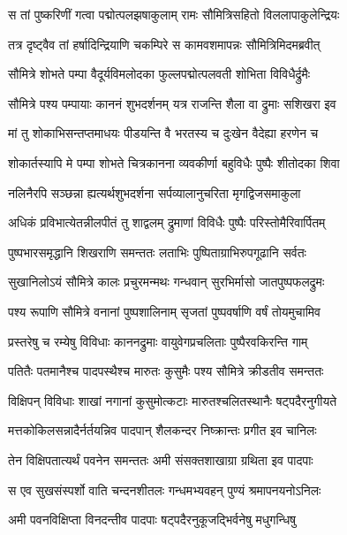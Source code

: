 
\twolineshloka
{स तां पुष्करिणीं गत्वा पद्मोत्पलझषाकुलाम्}
{रामः सौमित्रिसहितो विललापाकुलेन्द्रियः} %

\twolineshloka
{तत्र दृष्ट्वैव तां हर्षादिन्द्रियाणि चकम्पिरे}
{स कामवशमापन्नः सौमित्रिमिदमब्रवीत्} %

\twolineshloka
{सौमित्रे शोभते पम्पा वैदूर्यविमलोदका}
{फुल्लपद्मोत्पलवती शोभिता विविधैर्द्रुमैः} %

\twolineshloka
{सौमित्रे पश्य पम्पायाः काननं शुभदर्शनम्}
{यत्र राजन्ति शैला वा द्रुमाः सशिखरा इव} %

\twolineshloka
{मां तु शोकाभिसन्तप्तमाधयः पीडयन्ति वै}
{भरतस्य च दुःखेन वैदेह्या हरणेन च} %

\twolineshloka
{शोकार्तस्यापि मे पम्पा शोभते चित्रकानना}
{व्यवकीर्णा बहुविधैः पुष्पैः शीतोदका शिवा} %

\twolineshloka
{नलिनैरपि सञ्छन्ना ह्यत्यर्थशुभदर्शना}
{सर्पव्यालानुचरिता मृगद्विजसमाकुला} %

\twolineshloka
{अधिकं प्रविभात्येतन्नीलपीतं तु शाद्वलम्}
{द्रुमाणां विविधैः पुष्पैः परिस्तोमैरिवार्पितम्} %

\twolineshloka
{पुष्पभारसमृद्धानि शिखराणि समन्ततः}
{लताभिः पुष्पिताग्राभिरुपगूढानि सर्वतः} %

\twolineshloka
{सुखानिलोऽयं सौमित्रे कालः प्रचुरमन्मथः}
{गन्धवान् सुरभिर्मासो जातपुष्पफलद्रुमः} %

\twolineshloka
{पश्य रूपाणि सौमित्रे वनानां पुष्पशालिनाम्}
{सृजतां पुष्पवर्षाणि वर्षं तोयमुचामिव} %

\twolineshloka
{प्रस्तरेषु च रम्येषु विविधाः काननद्रुमाः}
{वायुवेगप्रचलिताः पुष्पैरवकिरन्ति गाम्} %

\twolineshloka
{पतितैः पतमानैश्च पादपस्थैश्च मारुतः}
{कुसुमैः पश्य सौमित्रे क्रीडतीव समन्ततः} %

\twolineshloka
{विक्षिपन् विविधाः शाखां नगानां कुसुमोत्कटाः}
{मारुतश्चलितस्थानैः षट्पदैरनुगीयते} %

\twolineshloka
{मत्तकोकिलसन्नादैर्नर्तयन्निव पादपान्}
{शैलकन्दर निष्क्रान्तः प्रगीत इव चानिलः} %

\twolineshloka
{तेन विक्षिपतात्यर्थं पवनेन समन्ततः}
{अमी संसक्तशाखाग्रा ग्रथिता इव पादपाः} %

\twolineshloka
{स एव सुखसंस्पर्शो वाति चन्दनशीतलः}
{गन्धमभ्यवहन् पुण्यं श्रमापनयनोऽनिलः} %

\twolineshloka
{अमी पवनविक्षिप्ता विनदन्तीव पादपाः}
{षट्पदैरनुकूजद्भिर्वनेषु मधुगन्धिषु} %

